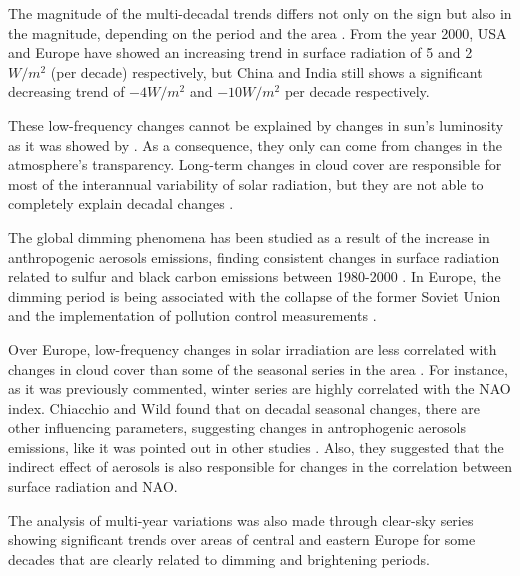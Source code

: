 The magnitude of the multi-decadal trends differs not only on the sign but also in the magnitude, depending on the period and the area \cite*{Wild2009, Wild2012}. From the year 2000, USA and Europe have showed an increasing trend in surface radiation of 5 and 2 $W/m^2$ (per decade) respectively, but China and India still shows a significant decreasing trend of $-4 W/m^2$ and $-10 W/m^2$ per decade respectively. 

These low-frequency changes cannot be explained by changes in sun's luminosity as it was showed by \cite*{Willson2003}. As a consequence, they only can come from changes in the atmosphere's transparency. Long-term changes in cloud cover are responsible for most of the interannual variability of solar radiation, but they are not able to completely explain decadal changes \cite*{Norris2007, Sanchez-Lorenzo2009}.

The global dimming phenomena has been studied as a result of the increase in anthropogenic aerosols emissions, finding consistent changes in surface radiation related to sulfur and black carbon emissions between 1980-2000 \cite*{Streets2006, Norris2007}. In Europe, the dimming period is being associated with the collapse of the former Soviet Union and the implementation of pollution control measurements \cite*{Wild2005, Wild2009}. %


Over Europe, low-frequency changes in solar irradiation are less correlated with changes in cloud cover than some of the seasonal series in the area \cite*{Sanchez-Lorenzo2009, Chiacchio2010}. For instance, as it was previously commented, winter series are highly correlated with the NAO index. Chiacchio and Wild \cite*{Chiacchio2010} found that on decadal seasonal changes, there are other influencing parameters, suggesting changes in antrophogenic aerosols emissions, like it was pointed out in other studies \cite*{Sanchez-Lorenzo2009, Sanchez-Lorenzo2013, Sanchez-Lorenzo2017}. Also, they suggested that the indirect effect of aerosols is also responsible for changes in the correlation between surface radiation and NAO.

The analysis of multi-year variations was also made through clear-sky series showing significant trends over areas of central and eastern Europe for some decades that are clearly related to dimming and brightening periods.

